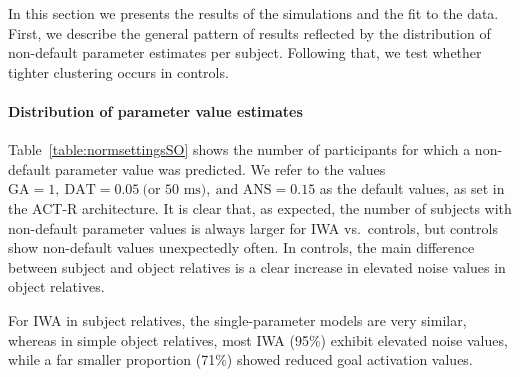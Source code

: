 \documentclass{cambridge7A}\usepackage[]{graphicx}\usepackage[]{color}
\begin{document}
\begin{table}
  \centering
  \caption{The number of participants in subject / object relatives (SR/OR) for which non-default parameter values were predicted, in the subject vs.\ object relative tasks, respectively; for goal activation (GA), default action time (DAT) and noise (ANS) parameters.}
  \label{table:normsettingsSO}
\end{table}

In this section we presents the results of the simulations and the fit to the data. First, we describe the general pattern of results reflected by the distribution of non-default parameter estimates per subject. Following that, we test whether tighter clustering occurs in controls.

\paragraph{Distribution of parameter value estimates} 
Table~\ref{table:normsettingsSO} shows the number of participants for which a non-default parameter value was predicted. 
We refer to the values $\text{GA} = 1,\ \text{DAT} = 0.05\ \text{(or 50 ms)},\ \text{and ANS} = 0.15$ as the default values, as set in the ACT-R architecture.
It is clear that, as expected, the number of subjects with non-default parameter values is always larger for IWA vs.\ controls, but controls show non-default values unexpectedly often.
In controls, the main difference between subject and object relatives is a clear increase in elevated noise values in object relatives.

For IWA in subject relatives, the single-parameter models are very similar, whereas in simple object relatives, most IWA (95\%) exhibit elevated noise values, while a far smaller proportion (71\%) showed reduced goal activation values. 
\end{document}
